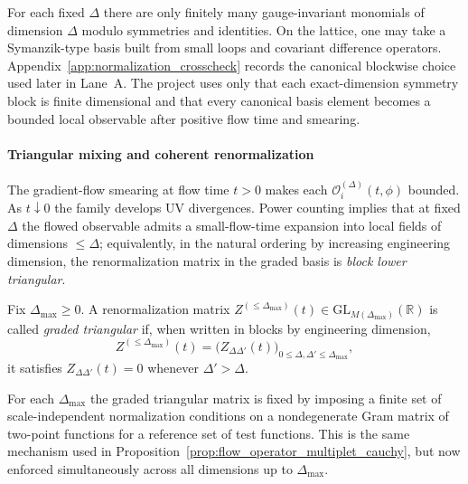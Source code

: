 \begin{remark}
For each fixed $\Delta$ there are only finitely many gauge-invariant monomials of dimension $\Delta$ modulo symmetries and identities.
On the lattice, one may take a Symanzik-type basis built from small loops and covariant difference operators.
Appendix~\ref{app:normalization_crosscheck} records the canonical blockwise choice used later in Lane~A.
The project uses only that each exact-dimension symmetry block is finite dimensional and that every canonical basis element becomes a bounded local observable after positive flow time and smearing.
\end{remark}

\paragraph*{Triangular mixing and coherent renormalization}

The gradient-flow smearing at flow time $t>0$ makes each $\mathcal O^{(\Delta)}_i(t,\phi)$ bounded.
As $t\downarrow 0$ the family develops UV divergences.
Power counting implies that at fixed $\Delta$ the flowed observable admits a small-flow-time expansion into local fields of dimensions
$\le \Delta$; equivalently, in the natural ordering by increasing engineering dimension, the renormalization matrix in the graded basis
is \emph{block lower triangular}.

\begin{definition}
\label{def:graded_Z}
Fix $\Delta_{\max}\ge 0$.
A renormalization matrix $Z^{(\le \Delta_{\max})}(t)\in\mathrm{GL}_{M(\Delta_{\max})}(\mathbb R)$ is called \emph{graded triangular}
if, when written in blocks by engineering dimension,
\[
Z^{(\le \Delta_{\max})}(t)=\bigl(Z_{\Delta\Delta'}(t)\bigr)_{0\le \Delta,\Delta'\le \Delta_{\max}},
\]
it satisfies $Z_{\Delta\Delta'}(t)=0$ whenever $\Delta'>\Delta$.
\end{definition}

\begin{remark}
For each $\Delta_{\max}$ the graded triangular matrix is fixed by imposing a finite set of scale-independent normalization conditions
on a nondegenerate Gram matrix of two-point functions for a reference set of test functions.
This is the same mechanism used in Proposition~\ref{prop:flow_operator_multiplet_cauchy}, but now enforced simultaneously
across all dimensions up to $\Delta_{\max}$.
\end{remark}


